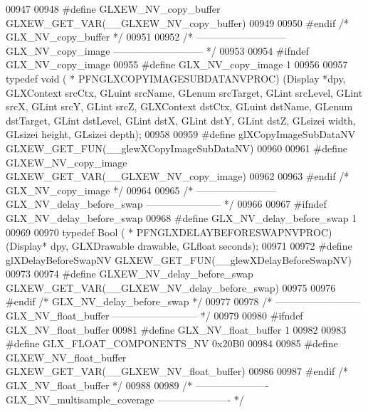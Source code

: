 \begin{DoxyCode}
00947 
00948 \textcolor{preprocessor}{#define GLXEW\_NV\_copy\_buffer GLXEW\_GET\_VAR(\_\_GLXEW\_NV\_copy\_buffer)}
00949 
00950 \textcolor{preprocessor}{#endif }\textcolor{comment}{/* GLX\_NV\_copy\_buffer */}\textcolor{preprocessor}{}
00951 
00952 \textcolor{comment}{/* --------------------------- GLX\_NV\_copy\_image --------------------------- */}
00953 
00954 \textcolor{preprocessor}{#ifndef GLX\_NV\_copy\_image}
00955 \textcolor{preprocessor}{#define GLX\_NV\_copy\_image 1}
00956 
00957 \textcolor{keyword}{typedef} void ( * PFNGLXCOPYIMAGESUBDATANVPROC) (Display *dpy, GLXContext srcCtx, 
      GLuint srcName, GLenum srcTarget, GLint srcLevel, GLint srcX, GLint srcY, GLint 
      srcZ, GLXContext dstCtx, GLuint dstName, GLenum dstTarget, GLint dstLevel, GLint 
      dstX, GLint dstY, GLint dstZ, GLsizei width, GLsizei height, GLsizei depth);
00958 
00959 \textcolor{preprocessor}{#define glXCopyImageSubDataNV GLXEW\_GET\_FUN(\_\_glewXCopyImageSubDataNV)}
00960 
00961 \textcolor{preprocessor}{#define GLXEW\_NV\_copy\_image GLXEW\_GET\_VAR(\_\_GLXEW\_NV\_copy\_image)}
00962 
00963 \textcolor{preprocessor}{#endif }\textcolor{comment}{/* GLX\_NV\_copy\_image */}\textcolor{preprocessor}{}
00964 
00965 \textcolor{comment}{/* ------------------------ GLX\_NV\_delay\_before\_swap ----------------------- */}
00966 
00967 \textcolor{preprocessor}{#ifndef GLX\_NV\_delay\_before\_swap}
00968 \textcolor{preprocessor}{#define GLX\_NV\_delay\_before\_swap 1}
00969 
00970 \textcolor{keyword}{typedef} Bool ( * PFNGLXDELAYBEFORESWAPNVPROC) (Display* dpy, GLXDrawable drawable, 
      GLfloat seconds);
00971 
00972 \textcolor{preprocessor}{#define glXDelayBeforeSwapNV GLXEW\_GET\_FUN(\_\_glewXDelayBeforeSwapNV)}
00973 
00974 \textcolor{preprocessor}{#define GLXEW\_NV\_delay\_before\_swap GLXEW\_GET\_VAR(\_\_GLXEW\_NV\_delay\_before\_swap)}
00975 
00976 \textcolor{preprocessor}{#endif }\textcolor{comment}{/* GLX\_NV\_delay\_before\_swap */}\textcolor{preprocessor}{}
00977 
00978 \textcolor{comment}{/* -------------------------- GLX\_NV\_float\_buffer -------------------------- */}
00979 
00980 \textcolor{preprocessor}{#ifndef GLX\_NV\_float\_buffer}
00981 \textcolor{preprocessor}{#define GLX\_NV\_float\_buffer 1}
00982 
00983 \textcolor{preprocessor}{#define GLX\_FLOAT\_COMPONENTS\_NV 0x20B0}
00984 
00985 \textcolor{preprocessor}{#define GLXEW\_NV\_float\_buffer GLXEW\_GET\_VAR(\_\_GLXEW\_NV\_float\_buffer)}
00986 
00987 \textcolor{preprocessor}{#endif }\textcolor{comment}{/* GLX\_NV\_float\_buffer */}\textcolor{preprocessor}{}
00988 
00989 \textcolor{comment}{/* ---------------------- GLX\_NV\_multisample\_coverage ---------------------- */}

\end{DoxyCode}
